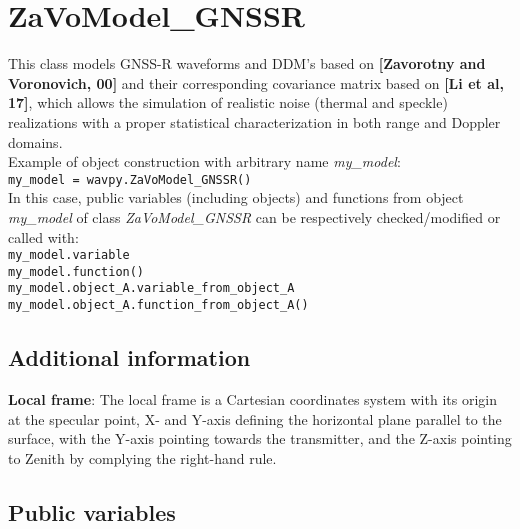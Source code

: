 \chapter{ZaVoModel\_GNSSR}\label{cha:ZVmodel}

This class models GNSS-R waveforms and DDM's based on {\bf [Zavorotny and Voronovich, 00]} and their corresponding covariance matrix based on {\bf [Li et al, 17]}, which allows the simulation of realistic noise (thermal and speckle) realizations with a proper statistical characterization in both range and Doppler domains.\\

Example of object construction with arbitrary name {\it my\_model}:\\

\texttt{my\_model = wavpy.ZaVoModel\_GNSSR()}\\

In this case, public variables (including objects) and functions from object {\it my\_model} of class {\it ZaVoModel\_GNSSR} can be respectively checked/modified or called with:\\

\texttt{my\_model.variable}\\

\texttt{my\_model.function()}\\

\texttt{my\_model.object\_A.variable\_from\_object\_A}\\

\texttt{my\_model.object\_A.function\_from\_object\_A()}\\

\section{Additional information}

{\bf Local frame}: The local frame is a Cartesian coordinates system with its origin at the specular point, X- and Y-axis defining the horizontal plane parallel to the surface, with the Y-axis pointing towards the transmitter, and the Z-axis pointing to Zenith by complying the right-hand rule.

\section{Public variables}

